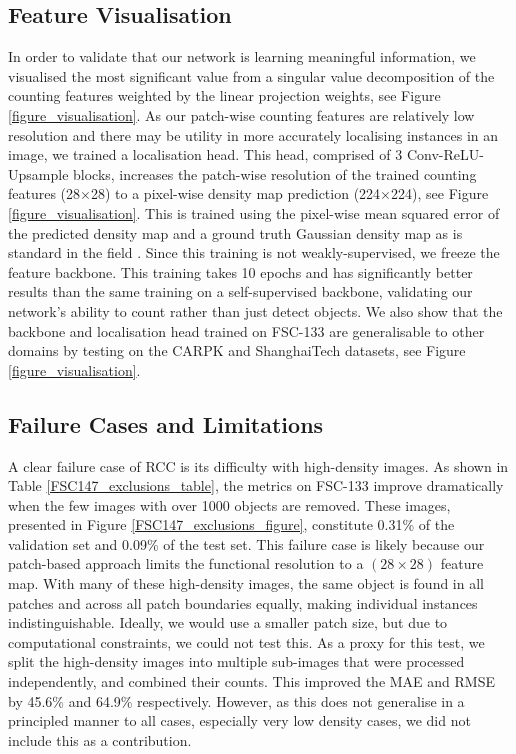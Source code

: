 \documentclass[letterpaper, 11pt]{IEEEtran}
\begin{document}
\subsection{Feature Visualisation}
\label{results_visualisation}
In order to validate that our network is learning meaningful information, we visualised the most significant value from a singular value decomposition of the counting features weighted by the linear projection weights, see Figure \ref{figure_visualisation}.
As our patch-wise counting features are relatively low resolution and there may be utility in more accurately localising instances in an image, we trained a localisation head. This head, comprised of 3 Conv-ReLU-Upsample blocks, increases the  patch-wise resolution of the trained counting features (28$\times$28) to a  pixel-wise density map prediction (224$\times$224), see Figure \ref{figure_visualisation}. This is trained using the pixel-wise mean squared error of the predicted density map and a ground truth Gaussian density map as is standard in the field \cite{ranjan2021Famnet}. Since this training is not weakly-supervised, we freeze the feature backbone. This training takes 10 epochs and has significantly better results than the same training on a self-supervised backbone, validating our network's ability to count rather than just detect objects. We also show that the backbone and localisation head trained on FSC-133 are generalisable to other domains by testing on the CARPK and ShanghaiTech \cite{zhang2016single} datasets, see Figure \ref{figure_visualisation}.
\subsection{Failure Cases and Limitations}
\label{failure_cases}
A clear failure case of RCC is its difficulty with high-density images.
As shown in Table \ref{FSC147_exclusions_table}, the metrics on FSC-133 improve dramatically when the few images with over 1000 objects are removed.
These images, presented in Figure \ref{FSC147_exclusions_figure}, constitute 0.31\% of the validation set and 0.09\% of the test set.
This failure case is likely because our patch-based approach limits the functional resolution to a $(28\times28)$ feature map.
With many of these high-density images, the same object is found in all patches and across all patch boundaries equally, making individual instances indistinguishable. 
Ideally, we would use a smaller patch size, but due to computational constraints, we could not test this.
As a proxy for this test, we split the high-density images into multiple sub-images that were processed independently, and combined their counts.
This improved the  MAE and RMSE by 45.6\% and 64.9\% respectively. 
However, as this does not generalise in a principled manner to all cases, especially very low density cases, we did not include this as a contribution.
\end{document}
